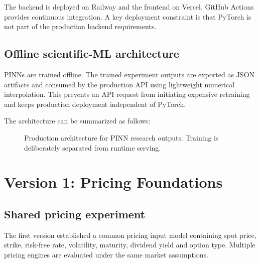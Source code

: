 \documentclass[11pt,a4paper]{article}
\begin{document}
The backend is deployed on Railway and the frontend on Vercel. GitHub Actions provides continuous integration. A key deployment constraint is that PyTorch is not part of the production backend requirements.

\subsection{Offline scientific-ML architecture}

PINNs are trained offline. The trained experiment outputs are exported as JSON artifacts and consumed by the production API using lightweight numerical interpolation. This prevents an API request from initiating expensive retraining and keeps production deployment independent of PyTorch.

The architecture can be summarized as follows:

\begin{figure}[H]
\centering
{}
\caption{Production architecture for PINN research outputs. Training is deliberately separated from runtime serving.}
\end{figure}

\section{Version 1: Pricing Foundations}

\subsection{Shared pricing experiment}

The first version established a common pricing input model containing spot price, strike, risk-free rate, volatility, maturity, dividend yield and option type. Multiple pricing engines are evaluated under the same market assumptions.
\end{document}
